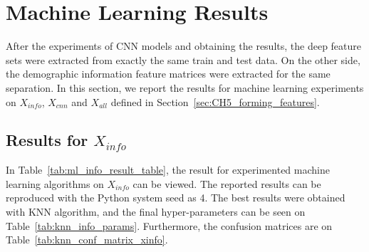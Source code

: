 \section{Machine Learning Results}



After the experiments of CNN models and obtaining the results, the deep feature sets were extracted from exactly the same train and test data. On the other side, the demographic information feature matrices were extracted for the same separation. In this section, we report the results for machine learning experiments on $X_{info}$, $X_{cnn}$ and $X_{all}$ defined in Section~\ref{sec:CH5_forming_features}.

\subsection{Results for $X_{info}$} \label{CH6:results_xinfo}

In Table~\ref{tab:ml_info_result_table}, the result for experimented machine learning algorithms on $X_{info}$ can be viewed. The reported results can be reproduced with the Python system seed as 4. The best results were obtained with KNN algorithm, and the final hyper-parameters can be seen on Table~\ref{tab:knn_info_params}. Furthermore, the confusion matrices are on Table~\ref{tab:knn_conf_matrix_xinfo}.

